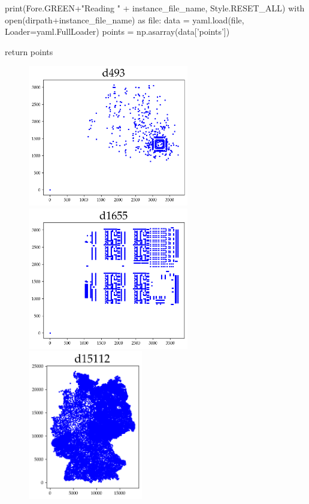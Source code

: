        print(Fore.GREEN+"Reading " + instance_file_name, Style.RESET_ALL)
        with open(dirpath+instance_file_name) as file:
            data = yaml.load(file, Loader=yaml.FullLoader)
            points = np.asarray(data['points'])
        
        return points 
           
\nwendcode{}\nwdocspar


 \begin{figure}[htbp]
   \centering
   \includegraphics[width=7cm]{../tsplib_euc2d_pictures_of_instances/d493.png}
   \includegraphics[width=7cm]{../tsplib_euc2d_pictures_of_instances/d1655.png}
   \includegraphics[width=5cm]{../tsplib_euc2d_pictures_of_instances/d15112.png}

\end{figure}
